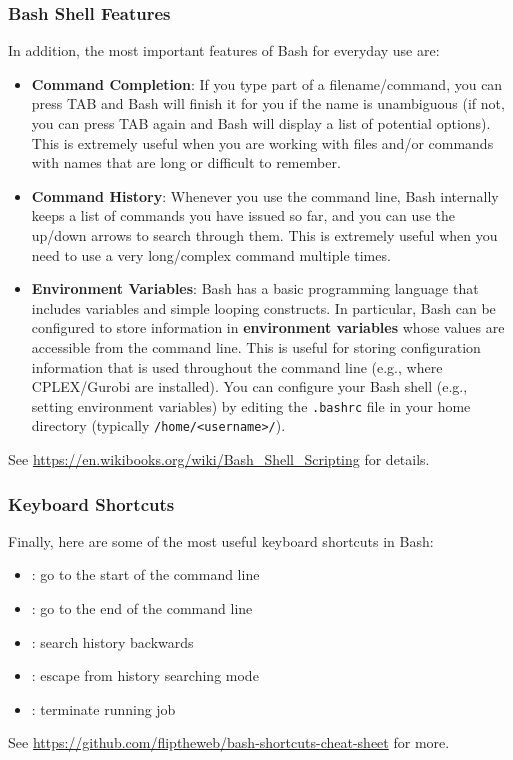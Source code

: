 \documentclass[12pt]{article}
\begin{document}
\subsubsection{Bash Shell Features}
In addition, the most important features of Bash for everyday use are:
\begin{itemize}
    \item \textbf{Command Completion}: If you type part of a filename/command, you can press TAB and Bash will finish it for you if the name is unambiguous (if not, you can press TAB again and Bash will display a list of potential options).
        This is extremely useful when you are working with files and/or commands with names that are long or difficult to remember.
    \item \textbf{Command History}: Whenever you use the command line, Bash internally keeps a list of commands you have issued so far, and you can use the up/down arrows to search through them.
        This is extremely useful when you need to use a very long/complex command multiple times.
    \item \textbf{Environment Variables}: Bash has a basic programming language that includes variables and simple looping constructs.
        In particular, Bash can be configured to store information in \textbf{environment variables} whose values are accessible from the command line.
        This is useful for storing configuration information that is used throughout the command line (e.g., where CPLEX/Gurobi are installed).
        You can configure your Bash shell (e.g., setting environment variables) by editing the \texttt{.bashrc} file in your home directory (typically \texttt{/home/<username>/}).
\end{itemize}

See \url{https://en.wikibooks.org/wiki/Bash_Shell_Scripting} for details.

\subsubsection{Keyboard Shortcuts}
Finally, here are some of the most useful keyboard shortcuts in Bash:
\begin{itemize}
    \item {}: go to the start of the command line
    \item {}: go to the end of the command line
    \item {}: search history backwards
    \item {}: escape from history searching mode
    \item {}: terminate running job
\end{itemize}
See \url{https://github.com/fliptheweb/bash-shortcuts-cheat-sheet} for more.
\end{document}
